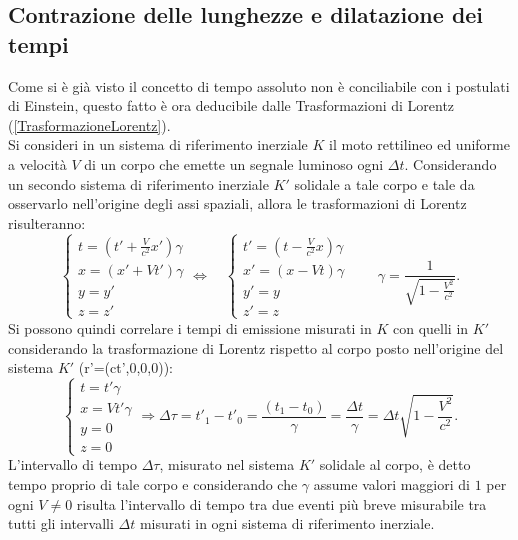 \subsection{Contrazione delle lunghezze e dilatazione dei tempi}
Come si è già visto il concetto di tempo assoluto non è conciliabile con i postulati di Einstein, questo fatto è ora deducibile dalle Trasformazioni di Lorentz (\ref{TrasformazioneLorentz}).\\
Si consideri in un sistema di riferimento inerziale $K$ il moto rettilineo ed uniforme a velocità $V$ di un corpo che emette un segnale luminoso ogni $\Delta t$. Considerando un secondo sistema di riferimento inerziale $K'$ solidale a tale corpo e tale da osservarlo nell'origine degli assi spaziali, allora le trasformazioni di Lorentz risulteranno:
\begin{equation*}
    \begin{cases}
        t=(t'+\frac{V}{c^2}x')\gamma\\
        x=(x'+Vt')\gamma\\
        y=y'\\
        z=z'
    \end{cases}
    \Longleftrightarrow \quad
    \begin{cases}
        t'=(t-\frac{V}{c^2}x)\gamma\\
        x'=(x-Vt)\gamma\\
        y'=y\\
        z'=z
    \end{cases}
    \qquad \gamma=\frac{1}{\sqrt{1-\frac{V^2}{c^2}}}.
\end{equation*}
Si possono quindi correlare i tempi di emissione misurati in $K$ con quelli in $K'$ considerando la trasformazione di Lorentz rispetto al corpo posto nell'origine del sistema $K'$ (r'=(ct',0,0,0)): 
\begin{equation}
    \begin{cases}
        t=t'\gamma\\
        x=Vt'\gamma\\
        y=0\\
        z=0
    \end{cases}
    \Rightarrow \Delta \tau=t'_1-t'_0=\frac{(t_1-t_0)}{\gamma}=\frac{\Delta t}{\gamma}=\Delta t \sqrt{1-\frac{V^2}{c^2}}.
    \label{dilatazioneTempi}
\end{equation}
L'intervallo di tempo $\Delta \tau$, misurato nel sistema $K'$ solidale al corpo, è detto tempo proprio di tale corpo e considerando che $\gamma$ assume valori maggiori di $1$ per ogni $V\neq 0$ risulta l'intervallo di tempo tra due eventi più breve misurabile tra tutti gli intervalli $\Delta t$ misurati in ogni sistema di riferimento inerziale.\\

